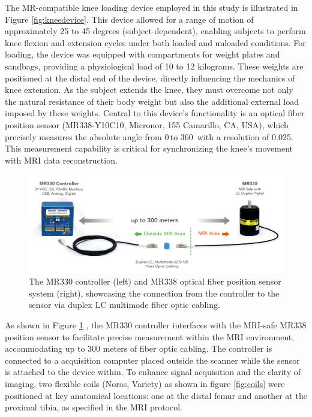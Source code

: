\documentclass{micro-econ-thesis}
\begin{document}
The MR-compatible knee loading device employed in this study is illustrated in Figure \ref{fig:kneedevice}. This device allowed for a range of motion of approximately 25 to 45 degrees (subject-dependent), enabling subjects to perform knee flexion and extension cycles under both loaded and unloaded conditions. For loading, the device was equipped with compartments for weight plates and sandbags, providing a physiological load of 10 to 12 kilograms. These weights are positioned at the distal end of the device, directly influencing the mechanics of knee extension. As the subject extends the knee, they must overcome not only the natural resistance of their body weight but also the additional external load imposed by these weights. Central to this device's functionality is an optical fiber position sensor (MR338-Y10C10, Micronor, 155 Camarillo, CA, USA), which precisely  measures the ab­solute angle from 0{\degree}\,to 360\degree \, with a resolution of 0.025\degree \parencite{rickenbach_optical_2013}. This measurement capability is critical for synchronizing the knee's movement with MRI data reconstruction. 
\begin{figure} [H]
	\centering
	\includegraphics[width=0.7\linewidth]{sensor_img}
	\caption{The MR330 controller (left) and MR338 optical fiber position sensor system (right), showcasing the connection from the controller to the sensor via duplex LC multimode fiber optic cabling.}
	\label{fig:sensorimg}
\end{figure}


As shown in Figure \ref{fig:sensorimg} , the MR330 controller interfaces with the MRI-safe MR338 position sensor to facilitate precise measurement within the MRI environment, accommodating up to 300 meters of fiber optic cabling. The controller is connected to a acquisition computer placed outside the scanner while the sensor is attached to the device within. To enhance signal acquisition and the clarity of imaging, two flexible coils (Noras, Variety) as shown in figure \ref{fig:coils} were positioned at key anatomical locations: one at the distal femur and another at the proximal tibia, as specified in the MRI protocol. 
\end{document}
